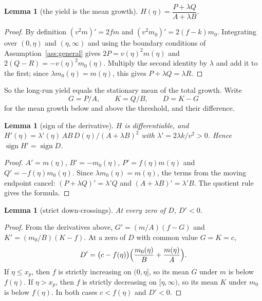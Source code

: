 \documentclass[11pt]{article}
\newtheorem{lemma}[theorem]{Lemma}
\theoremstyle{definition}
\DeclareMathOperator{\sign}{sign}
\begin{document}
\begin{lemma}[the yield is the mean growth]\label{lem:mean}
$H(\eta) = \dfrac{P + \lambda Q}{A + \lambda B}$.
\end{lemma}

\begin{proof}
By definition $(v^2 m)' = 2fm$ and $(v^2 m_0)' = 2(f - k)m_0$. Integrating over $(0,\eta)$ and $(\eta,\infty)$
and using the boundary conditions of Assumption~\ref{ass:general} gives $2P = v(\eta)^2 m(\eta)$ and
$2(Q - R) = -v(\eta)^2 m_0(\eta)$. Multiply the second identity by $\lambda$ and add it to the first; since
$\lambda m_0(\eta) = m(\eta)$, this gives $P + \lambda Q = \lambda R$.
\end{proof}

So the long-run yield equals the stationary mean of the total growth. Write
\[
  G = P/A, \qquad K = Q/B, \qquad D = K - G
\]
for the mean growth below and above the threshold, and their difference.

\begin{lemma}[sign of the derivative]\label{lem:sign}
$H$ is differentiable, and
$H'(\eta) = \lambda'(\eta)\,A B\,D(\eta)/(A + \lambda B)^2$ with $\lambda' = 2\lambda k/v^2 > 0$. Hence
$\sign H' = \sign D$.
\end{lemma}

\begin{proof}
$A' = m(\eta)$, $B' = -m_0(\eta)$, $P' = f(\eta)m(\eta)$ and $Q' = -f(\eta)m_0(\eta)$. Since $\lambda m_0(\eta) =
m(\eta)$, the terms from the moving endpoint cancel: $(P + \lambda Q)' = \lambda' Q$ and $(A + \lambda B)' =
\lambda' B$. The quotient rule gives the formula.
\end{proof}

\begin{lemma}[strict down-crossings]\label{lem:cross}
At every zero of $D$, $D' < 0$.
\end{lemma}

\begin{proof}
From the derivatives above, $G' = (m/A)(f - G)$ and $K' = (m_0/B)(K - f)$. At a zero of $D$ with common value
$G = K = c$,
\[
  D' = \bigl(c - f(\eta)\bigr)\Bigl(\frac{m_0(\eta)}{B} + \frac{m(\eta)}{A}\Bigr).
\]
If $\eta \le x_p$, then $f$ is strictly increasing on $(0,\eta]$, so its mean $G$ under $m$ is below $f(\eta)$.
If $\eta > x_p$, then $f$ is strictly decreasing on $[\eta,\infty)$, so its mean $K$ under $m_0$ is below
$f(\eta)$. In both cases $c < f(\eta)$ and $D' < 0$.
\end{proof}
\end{document}
